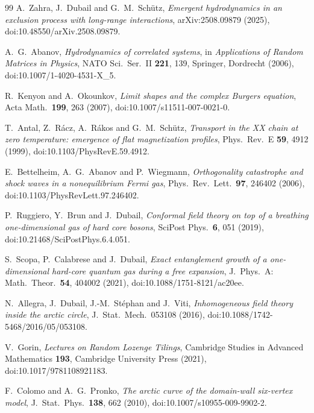 \documentclass[11pt]{article}
\numberwithin{equation}{section}
\newcommand{\1}{\mathbf 1}
\begin{document}
\begin{thebibliography}{99}
A.~Zahra, J.~Dubail and G.~M.~Sch\"utz,
\emph{Emergent hydrodynamics in an exclusion process with long-range
interactions},
arXiv:2508.09879 (2025),
doi:10.48550/arXiv.2508.09879.

A.~G.~Abanov,
\emph{Hydrodynamics of correlated systems},
in \emph{Applications of Random Matrices in Physics}, NATO Sci.~Ser.~II
\textbf{221}, 139, Springer, Dordrecht (2006),
doi:10.1007/1-4020-4531-X\_5.

R.~Kenyon and A.~Okounkov,
\emph{Limit shapes and the complex Burgers equation},
Acta Math.~\textbf{199}, 263 (2007),
doi:10.1007/s11511-007-0021-0.

T.~Antal, Z.~R\'acz, A.~R\'akos and G.~M.~Sch\"utz,
\emph{Transport in the XX chain at zero temperature: emergence of flat
magnetization profiles},
Phys.~Rev.~E \textbf{59}, 4912 (1999),
doi:10.1103/PhysRevE.59.4912.

E.~Bettelheim, A.~G.~Abanov and P.~Wiegmann,
\emph{Orthogonality catastrophe and shock waves in a nonequilibrium Fermi gas},
Phys.~Rev.~Lett.~\textbf{97}, 246402 (2006),
doi:10.1103/PhysRevLett.97.246402.

P.~Ruggiero, Y.~Brun and J.~Dubail,
\emph{Conformal field theory on top of a breathing one-dimensional gas of hard
core bosons},
SciPost Phys.~\textbf{6}, 051 (2019),
doi:10.21468/SciPostPhys.6.4.051.

S.~Scopa, P.~Calabrese and J.~Dubail,
\emph{Exact entanglement growth of a one-dimensional hard-core quantum gas
during a free expansion},
J.~Phys.~A: Math.~Theor.~\textbf{54}, 404002 (2021),
doi:10.1088/1751-8121/ac20ee.

N.~Allegra, J.~Dubail, J.-M.~St\'ephan and J.~Viti,
\emph{Inhomogeneous field theory inside the arctic circle},
J.~Stat.~Mech.~053108 (2016),
doi:10.1088/1742-5468/2016/05/053108.

V.~Gorin,
\emph{Lectures on Random Lozenge Tilings},
Cambridge Studies in Advanced Mathematics \textbf{193}, Cambridge University
Press (2021),
doi:10.1017/9781108921183.

F.~Colomo and A.~G.~Pronko,
\emph{The arctic curve of the domain-wall six-vertex model},
J.~Stat.~Phys.~\textbf{138}, 662 (2010),
doi:10.1007/s10955-009-9902-2.


\end{thebibliography}
\end{document}
